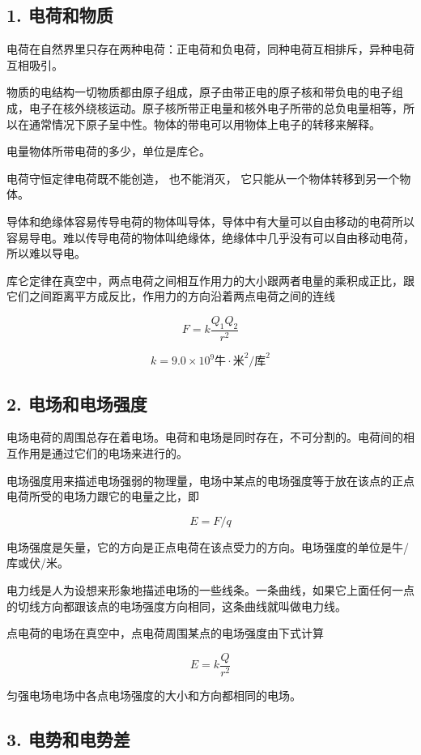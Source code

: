 \subsection{1. 电荷和物质}\label{ux7535ux8377ux548cux7269ux8d28}

电荷在自然界里只存在两种电荷：正电荷和负电荷，同种电荷互相排斥，异种电荷互相吸引。

物质的电结构一切物质都由原子组成，原子由带正电的原子核和带负电的电子组成，电子在核外绕核运动。原子核所带正电量和核外电子所带的总负电量相等，所以在通常情况下原子呈中性。物体的带电可以用物体上电子的转移来解释。

电量物体所带电荷的多少，单位是库仑。

电荷守恒定律电荷既不能创造， 也不能消灭，
它只能从一个物体转移到另一个物体。

导体和绝缘体容易传导电荷的物体叫导体，导体中有大量可以自由移动的电荷所以容易导电。难以传导电荷的物体叫绝缘体，绝缘体中几乎没有可以自由移动电荷，所以难以导电。

库仑定律在真空中，两点电荷之间相互作用力的大小跟两者电量的乘积成正比，跟它们之间距离平方成反比，作用力的方向沿着两点电荷之间的连线

\[
F = k \frac{Q_{1} Q_{2}}{r^{2}}
\]

\[
k = 9.0 \times 10^{9} \text{牛} \cdot \text{米}^{2} / \text{库}^{2}
\]

\subsection{2.
电场和电场强度}\label{ux7535ux573aux548cux7535ux573aux5f3aux5ea6}

电场电荷的周围总存在着电场。电荷和电场是同时存在，不可分割的。电荷间的相互作用是通过它们的电场来进行的。

电场强度用来描述电场强弱的物理量，电场中某点的电场强度等于放在该点的正点电荷所受的电场力跟它的电量之比，即

\[
E = F / q
\]

电场强度是矢量，它的方向是正点电荷在该点受力的方向。电场强度的单位是牛/库或伏/米。

电力线是人为设想来形象地描述电场的一些线条。一条曲线，如果它上面任何一点的切线方向都跟该点的电场强度方向相同，这条曲线就叫做电力线。

点电荷的电场在真空中，点电荷周围某点的电场强度由下式计算

\[
E=k\frac{Q}{r^{2}}
\]

匀强电场电场中各点电场强度的大小和方向都相同的电场。

\subsection{3.
电势和电势差}\label{ux7535ux52bfux548cux7535ux52bfux5dee-1}

